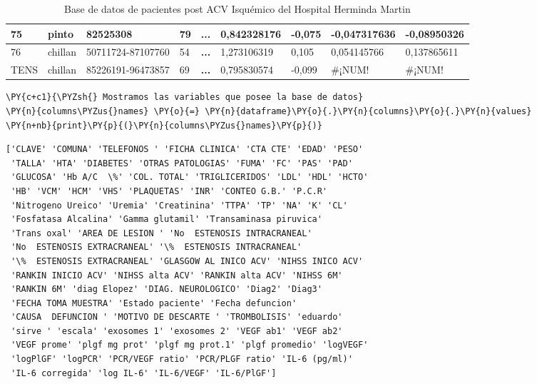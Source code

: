 \begin{table}[H]
{\begin{tabular}{|l|l|l|l|c|l|l|l|l|}
75 & pinto & 82525308 & 79 & \textbf{...} & 0,842328176 & -0,075 & -0,047317636 & -0,08950326 \\ \hline
76 & chillan & 50711724-87107760 & 54 & \textbf{...} & 1,273106319 & 0,105 & 0,054145766 & 0,137865611 \\ \hline
TENS & chillan & 85226191-96473857 & 69 & \textbf{...} & 0,795830574 & -0,099 & \#¡NUM! & \#¡NUM! \\ \hline
\end{tabular}%
}
\caption{Base de datos de pacientes post ACV Isquémico del Hospital Herminda Martin}
\label{tab:bdd}
\end{table}

    \begin{tcolorbox}[breakable, size=fbox, boxrule=1pt, pad at break*=1mm,colback=cellbackground, colframe=cellborder]
\begin{Verbatim}[commandchars=\\\{\}]
\PY{c+c1}{\PYZsh{} Mostramos las variables que posee la base de datos}
\PY{n}{columns\PYZus{}names} \PY{o}{=} \PY{n}{dataframe}\PY{o}{.}\PY{n}{columns}\PY{o}{.}\PY{n}{values}
\PY{n+nb}{print}\PY{p}{(}\PY{n}{columns\PYZus{}names}\PY{p}{)}
\end{Verbatim}
\end{tcolorbox}

    \begin{Verbatim}[commandchars=\\\{\}]
['CLAVE' 'COMUNA' 'TELEFONOS ' 'FICHA CLINICA' 'CTA CTE' 'EDAD' 'PESO'
 'TALLA' 'HTA' 'DIABETES' 'OTRAS PATOLOGIAS' 'FUMA' 'FC' 'PAS' 'PAD'
 'GLUCOSA' 'Hb A/C  \%' 'COL. TOTAL' 'TRIGLICERIDOS' 'LDL' 'HDL' 'HCTO'
 'HB' 'VCM' 'HCM' 'VHS' 'PLAQUETAS' 'INR' 'CONTEO G.B.' 'P.C.R'
 'Nitrogeno Ureico' 'Uremia' 'Creatinina' 'TTPA' 'TP' 'NA' 'K' 'CL'
 'Fosfatasa Alcalina' 'Gamma glutamil' 'Transaminasa piruvica'
 'Trans oxal' 'AREA DE LESION ' 'No  ESTENOSIS INTRACRANEAL'
 'No  ESTENOSIS EXTRACRANEAL' '\%  ESTENOSIS INTRACRANEAL'
 '\%  ESTENOSIS EXTRACRANEAL' 'GLASGOW AL INICO ACV' 'NIHSS INICO ACV'
 'RANKIN INICIO ACV' 'NIHSS alta ACV' 'RANKIN alta ACV' 'NIHSS 6M'
 'RANKIN 6M' 'diag Elopez' 'DIAG. NEUROLOGICO' 'Diag2' 'Diag3'
 'FECHA TOMA MUESTRA' 'Estado paciente' 'Fecha defuncion'
 'CAUSA  DEFUNCION ' 'MOTIVO DE DESCARTE ' 'TROMBOLISIS' 'eduardo'
 'sirve ' 'escala' 'exosomes 1' 'exosomes 2' 'VEGF ab1' 'VEGF ab2'
 'VEGF prome' 'plgf mg prot' 'plgf mg prot.1' 'plgf promedio' 'logVEGF'
 'logPlGF' 'logPCR' 'PCR/VEGF ratio' 'PCR/PLGF ratio' 'IL-6 (pg/ml)'
 'IL-6 corregida' 'log IL-6' 'IL-6/VEGF' 'IL-6/PlGF']
    \end{Verbatim}

